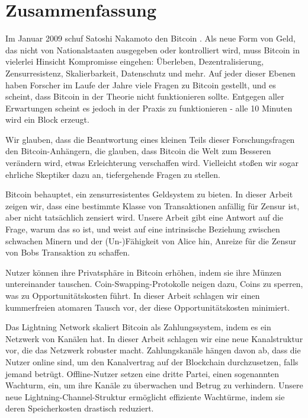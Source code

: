 \chapter*{Zusammenfassung}
Im Januar 2009 schuf Satoshi Nakamoto den Bitcoin \cite{bitcoin_whitepaper}. Als neue Form von Geld, das nicht von Nationalstaaten ausgegeben oder kontrolliert wird, muss Bitcoin in vielerlei Hinsicht Kompromisse eingehen: Überleben, Dezentralisierung, Zensurresistenz, Skalierbarkeit, Datenschutz und mehr. Auf jeder dieser Ebenen haben Forscher im Laufe der Jahre viele Fragen zu Bitcoin gestellt, und es scheint, dass Bitcoin in der Theorie nicht funktionieren sollte. Entgegen aller Erwartungen scheint es jedoch in der Praxis zu funktionieren - alle 10 Minuten wird ein Block erzeugt.

Wir glauben, dass die Beantwortung eines kleinen Teils dieser Forschungsfragen den Bitcoin-Anhängern, die glauben, dass Bitcoin die Welt zum Besseren verändern wird, etwas Erleichterung verschaffen wird. Vielleicht stoßen wir sogar ehrliche Skeptiker dazu an, tiefergehende Fragen zu stellen.

Bitcoin behauptet, ein zensurresistentes Geldsystem zu bieten. In dieser Arbeit zeigen wir, dass eine bestimmte Klasse von Transaktionen anfällig für Zensur ist, aber nicht tatsächlich zensiert wird. Unsere Arbeit gibt eine Antwort auf die Frage, warum das so ist, und weist auf eine intrinsische Beziehung zwischen schwachen Minern und der (Un-)Fähigkeit von Alice hin, Anreize für die Zensur von Bobs Transaktion zu schaffen.

Nutzer können ihre Privatsphäre in Bitcoin erhöhen, indem sie ihre Münzen untereinander tauschen. Coin-Swapping-Protokolle neigen dazu, Coins zu sperren, was zu Opportunitätskosten führt. In dieser Arbeit schlagen wir einen kummerfreien atomaren Tausch vor, der diese Opportunitätskosten minimiert. 

Das Lightning Network skaliert Bitcoin als Zahlungssystem, indem es ein Netzwerk von Kanälen hat. In dieser Arbeit schlagen wir eine neue Kanalstruktur vor, die das Netzwerk robuster macht. Zahlungskanäle hängen davon ab, dass die Nutzer online sind, um den Kanalvertrag auf der Blockchain durchzusetzen, falls jemand betrügt. Offline-Nutzer setzen eine dritte Partei, einen sogenannten Wachturm, ein, um ihre Kanäle zu überwachen und Betrug zu verhindern. Unsere neue Lightning-Channel-Struktur ermöglicht effiziente Wachtürme, indem sie deren Speicherkosten drastisch reduziert. 

